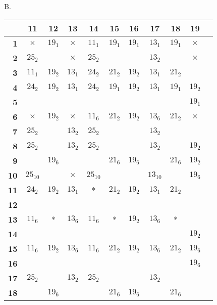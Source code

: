 \documentclass[oneside]{article}
\begin{document}
\begin{center}
B.\
\begin{tabular}{|r|c|c|c|c|c|c|c|c|c|c|} \hline
           &11       &12    &13       &14       &15    &16    &17       &18    &19       \\ \hline
\textbf{1} &$\times$ &$19_1$&$\times$ &$11_1$   &$19_1$&$19_1$&$13_1$   &$19_1$&$\times$ \\ \hline
\textbf{2} &$25_2$   &      &$\times$ &$25_2$   &      &      &$13_2$   &      &$\times$ \\ \hline
\textbf{3} &$11_1$   &$19_2$&$13_1$   &$24_2$   &$21_2$&$19_2$&$13_1$   &$21_2$&         \\ \hline
\textbf{4} &$24_2$   &$19_2$&$13_1$   &$24_2$   &$19_1$&$19_2$&$13_1$   &$19_1$&$19_2$   \\ \hline
\textbf{5} &         &      &         &         &      &      &         &      &$19_1$   \\ \hline
\textbf{6} &$\times$ &$19_2$&$\times$ &$11_6$   &$21_2$&$19_2$&$13_6$   &$21_2$&$\times$ \\ \hline
\textbf{7} &$25_2$   &      &$13_2$   &$25_2$   &      &      &$13_2$   &      &         \\ \hline
\textbf{8} &$25_2$   &      &$13_2$   &$25_2$   &      &      &$13_2$   &      &$19_2$   \\ \hline
\textbf{9} &         &$19_6$&         &         &$21_6$&$19_6$&         &$21_6$&$19_2$   \\ \hline
\textbf{10}&$25_{10}$&      &$\times$ &$25_{10}$&      &      &$13_{10}$&      &$19_6$   \\ \hline
\textbf{11}&$24_2$   &$19_2$&$13_1$   &*        &$21_2$&$19_2$&$13_1$   &$21_2$&         \\ \hline
\textbf{12}&         &      &         &         &      &      &         &      &         \\ \hline
\textbf{13}&$11_6$   &*     &$13_6$   &$11_6$   &*     &$19_2$&$13_6$   &*     &         \\ \hline
\textbf{14}&         &      &         &         &      &      &         &      &$19_2$   \\ \hline
\textbf{15}&$11_6$   &$19_2$&$13_6$   &$11_6$   &$21_2$&$19_2$&$13_6$   &$21_2$&$19_6$   \\ \hline
\textbf{16}&         &      &         &         &      &      &         &      &$19_6$   \\ \hline
\textbf{17}&$25_2$   &      &$13_2$   &$25_2$   &      &      &$13_2$   &      &         \\ \hline
\textbf{18}&         &$19_6$&         &         &$21_6$&$19_6$&         &$21_6$&         \\ \hline

\end{tabular}
\end{center}
\end{document}

